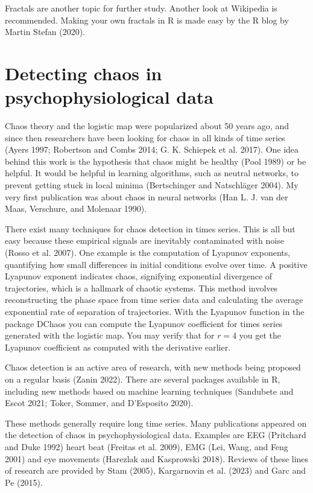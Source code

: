 \documentclass[
  a4paper,
  DIV=11,
  numbers=noendperiod]{scrreprt}
\begin{document}
Fractals are another topic for further study. Another look at Wikipedia
is recommended. Making your own fractals in R is made easy by the R blog
by Martin Stefan (2020).

\hypertarget{sec-Detecting-chaos-in-psychophysiological-data}{%
\section{Detecting chaos in psychophysiological
data}\label{sec-Detecting-chaos-in-psychophysiological-data}}

Chaos theory and the logistic map were popularized about 50 years ago,
and since then researchers have been looking for chaos in all kinds of
time series (Ayers 1997; Robertson and Combs 2014; G. K. Schiepek et al.
2017). One idea behind this work is the hypothesis that chaos might be
healthy (Pool 1989) or be helpful. It would be helpful in learning
algorithms, such as neutral networks, to prevent getting stuck in local
minima (Bertschinger and Natschläger 2004). My very first publication
was about chaos in neural networks (Han L. J. van der Maas, Verschure,
and Molenaar 1990).

There exist many techniques for chaos detection in times series. This is
all but easy because these empirical signals are inevitably contaminated
with noise (Rosso et al. 2007). One example is the computation of
Lyapunov exponents, quantifying how small differences in initial
conditions evolve over time. A positive Lyapunov exponent indicates
chaos, signifying exponential divergence of trajectories, which is a
hallmark of chaotic systems. This method involves reconstructing the
phase space from time series data and calculating the average
exponential rate of separation of trajectories. With the Lyapunov
function in the package DChaos you can compute the Lyapunov coefficient
for times series generated with the logistic map. You may verify that
for \(r = 4\) you get the Lyapunov coefficient as computed with the
derivative earlier.

Chaos detection is an active area of research, with new methods being
proposed on a regular basis (Zanin 2022). There are several packages
available in R, including new methods based on machine learning
techniques (Sandubete and Escot 2021; Toker, Sommer, and D'Esposito
2020).

These methods generally require long time series. Many publications
appeared on the detection of chaos in psychophysiological data. Examples
are EEG (Pritchard and Duke 1992) heart beat (Freitas et al. 2009), EMG
(Lei, Wang, and Feng 2001) and eye movements (Harezlak and Kasprowski
2018). Reviews of these lines of research are provided by Stam (2005),
Kargarnovin et al. (2023) and Garc and Pe (2015).
\end{document}
